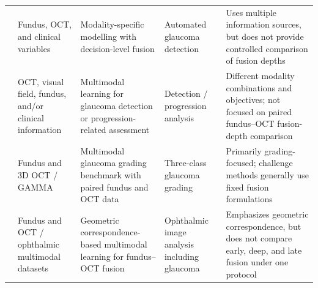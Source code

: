 \documentclass[preprint,12pt]{elsarticle}
\begin{document}
\begin{table}[!t]
{\begin{tabular}{p{} p{} p{} p{} p{}}
            \cite{mehta2021automated}                                                                   &
            Fundus, OCT, and clinical variables                                                         &
            Modality-specific modelling with decision-level fusion                                      &
            Automated glaucoma detection                                                                &
            Uses multiple information sources, but does not provide controlled comparison of fusion depths                                      \\

            \cite{luo2023harvard,hwang2025utilization,lim2022use}                                       &
            OCT, visual field, fundus, and/or clinical information                                      &
            Multimodal learning for glaucoma detection or progression-related assessment                &
            Detection / progression analysis                                                            &
            Different modality combinations and objectives; not focused on paired fundus--OCT fusion-depth comparison                           \\

            \cite{wu2023gamma}                                                                          &
            Fundus and 3D OCT / GAMMA                                                                   &
            Multimodal glaucoma grading benchmark with paired fundus and OCT data                       &
            Three-class glaucoma grading                                                                &
            Primarily grading-focused; challenge methods generally use fixed fusion formulations                                                \\

            \cite{wang2024geometric}                                                                    &
            Fundus and OCT / ophthalmic multimodal datasets                                             &
            Geometric correspondence-based multimodal learning for fundus--OCT fusion                   &
            Ophthalmic image analysis including glaucoma                                                &
            Emphasizes geometric correspondence, but does not compare early, deep, and late fusion under one protocol                           \\


\end{tabular}}
\end{table}
\end{document}
